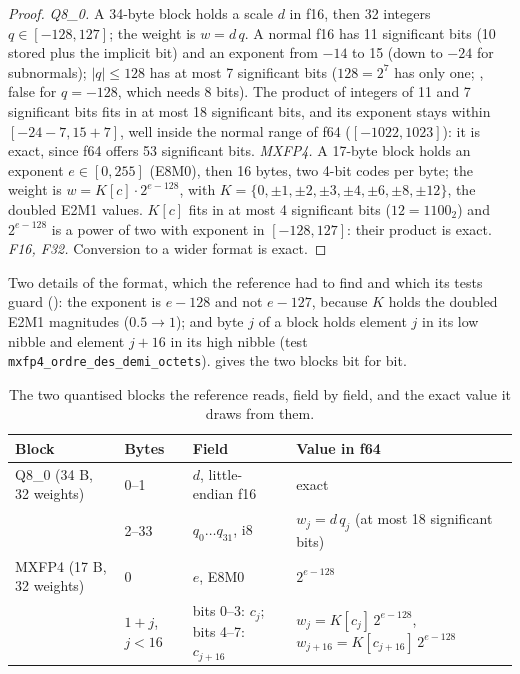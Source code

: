 \begin{proof}
\emph{Q8\_0.} A 34-byte block holds a scale $d$ in f16, then 32 integers $q \in [-128, 127]$; the weight is $w = d\,q$. A normal f16 has 11 significant bits (10 stored plus the implicit bit) and an exponent from $-14$ to 15 (down to $-24$ for subnormals); $|q| \le 128$ has at most 7 significant bits ($128 = 2^7$ has only one; , false for $q = -128$, which needs 8 bits). The product of integers of 11 and 7 significant bits fits in at most 18 significant bits, and its exponent stays within $[-24-7, 15+7]$, well inside the normal range of f64 ($[-1022, 1023]$): it is exact, since f64 offers 53 significant bits.
\emph{MXFP4.} A 17-byte block holds an exponent $e \in [0, 255]$ (E8M0), then 16 bytes, two 4-bit codes per byte; the weight is $w = K[c]\cdot 2^{e-128}$, with $K = \{0, \pm1, \pm2, \pm3, \pm4, \pm6, \pm8, \pm12\}$, the doubled E2M1 values. $K[c]$ fits in at most 4 significant bits ($12 = 1100_2$) and $2^{e-128}$ is a power of two with exponent in $[-128, 127]$: their product is exact.
\emph{F16, F32.} Conversion to a wider format is exact.
\end{proof}

Two details of the format, which the reference had to find and which its tests guard (): the exponent is $e - 128$ and not $e - 127$, because $K$ holds the doubled E2M1 magnitudes ($0.5 \to 1$); and byte $j$ of a block holds element $j$ in its low nibble and element $j+16$ in its high nibble (test \texttt{mxfp4\_ordre\_des\_demi\_octets}).  gives the two blocks bit for bit.

\begin{table}[ht]
\centering\small
\caption[The two blocks the reference reads]{The two quantised blocks the reference reads, field by field, and the exact value it draws from them.}
\label{tab:t2r-blocs}
\begin{tabular}{@{}llll@{}}
\toprule
Block & Bytes & Field & Value in f64 \\
\midrule
Q8\_0 (34 B, 32 weights) & 0--1 & $d$, little-endian f16 & exact \\
 & 2--33 & $q_0 \ldots q_{31}$, i8 & $w_j = d\, q_j$ (at most 18 significant bits) \\
\addlinespace
MXFP4 (17 B, 32 weights) & 0 & $e$, E8M0 & $2^{e-128}$ \\
 & $1+j$, $j<16$ & bits 0--3: $c_j$; bits 4--7: $c_{j+16}$ & $w_j = K[c_j]\,2^{e-128}$, $w_{j+16} = K[c_{j+16}]\,2^{e-128}$ \\
\bottomrule
\end{tabular}
\end{table}

